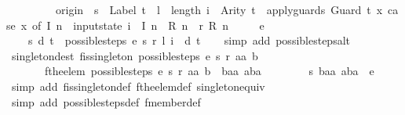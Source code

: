 \begin{isabellebody}
\ \ \ \ \ \ \ \ \ origin\ {\isacharequal}\ s\ {\isasymand}\ Label\ t\ {\isacharequal}\ l\ {\isasymand}\ length\ i\ {\isacharequal}\ Arity\ t\ {\isasymand}\ apply{\isacharunderscore}guards\ {\isacharparenleft}Guard\ t{\isacharparenright}\ {\isacharparenleft}{\isasymlambda}x{\isachardot}\ case\ x\ of\ I\ n\ {\isasymRightarrow}\ input{}state\ i\ {}\ {\isacharparenleft}I\ n{\isacharparenright}\ {\isacharbar}\ R\ n\ {\isasymRightarrow}\ r\ {\isacharparenleft}R\ n{\isacharparenright}{\isacharparenright}{\isacharparenright}\isanewline
\ \ \ \ \ e\ {\isacharequal}\isanewline
\ \ \ \ {\isacharbraceleft}{\isacharbar}{\isacharparenleft}{\isacharparenleft}s{\isacharcomma}\ d{\isacharparenright}{\isacharcomma}\ t{\isacharparenright}{\isacharbar}{\isacharbraceright}{\isacharparenright}\ {\isasymLongrightarrow}\ {\isacharparenleft}possible{\isacharunderscore}steps\ e\ s\ r\ l\ i\ {\isacharequal}\ {\isacharbraceleft}{\isacharbar}{\isacharparenleft}d{\isacharcomma}\ t{\isacharparenright}{\isacharbar}{\isacharbraceright}{\isacharparenright}{\isachardoublequoteclose}\isanewline
%
\isadelimproof
\ \ %
\endisadelimproof
%
\isatagproof
{}\isamarkupfalse%
\ {\isacharparenleft}simp\ add{\isacharcolon}\ possible{\isacharunderscore}steps{\isacharunderscore}alt{\isacharparenright}%
\endisatagproof
{\isafoldproof}%
%
\isadelimproof
\isanewline
%
\endisadelimproof
\isanewline
{}\isamarkupfalse%
\ singleton{\isacharunderscore}dest{\isacharcolon}\ {\isachardoublequoteopen}fis{\isacharunderscore}singleton\ {\isacharparenleft}possible{\isacharunderscore}steps\ e\ s\ r\ aa\ b{\isacharparenright}\ {\isasymLongrightarrow}\isanewline
\ \ \ \ \ \ \ fthe{\isacharunderscore}elem\ {\isacharparenleft}possible{\isacharunderscore}steps\ e\ s\ r\ aa\ b{\isacharparenright}\ {\isacharequal}\ {\isacharparenleft}baa{\isacharcomma}\ aba{\isacharparenright}\ {\isasymLongrightarrow}\isanewline
\ \ \ \ \ \ \ {\isacharparenleft}{\isacharparenleft}s{\isacharcomma}\ baa{\isacharparenright}{\isacharcomma}\ aba{\isacharparenright}\ {\isacharbar}{\isasymin}{\isacharbar}\ e{\isachardoublequoteclose}\isanewline
%
\isadelimproof
\ \ %
\endisadelimproof
%
\isatagproof
{}\isamarkupfalse%
\ {\isacharparenleft}simp\ add{\isacharcolon}\ fis{\isacharunderscore}singleton{\isacharunderscore}def\ fthe{\isacharunderscore}elem{\isacharunderscore}def\ singleton{\isacharunderscore}equiv{\isacharparenright}\isanewline
\ \ \isamarkupfalse%
\ {\isacharparenleft}simp\ add{\isacharcolon}\ possible{\isacharunderscore}steps{\isacharunderscore}def\ fmember{\isacharunderscore}def{\isacharparenright}\isanewline

\end{isabellebody}
